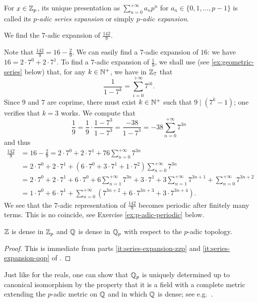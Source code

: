 \documentclass[12pt, leqno, british]{amsart}
\begin{document}
For $x \in \mathbb Z_p$, its unique presentation as $\sum_{n=0}^{+\infty} a_np^n$ for $a_n \in \lbrace 0, 1, \ldots, p-1 \rbrace$ is called its \emph{$p$-adic series expansion} or simply \emph{$p$-adic expansion}.
\begin{eg}
We find the $7$-adic expansion of $\frac{142}{9}$.

Note that $\frac{142}{9} = 16 - \frac{2}{9}$.
We can easily find a $7$-adic expansion of $16$: we have $16 = 2\cdot 7^0 + 2 \cdot 7^1$.
To find a $7$-adic expansion of $\frac{1}{9}$, we shall use (see \eqref{ex:geometric-series} below) that, for any $k \in \mathbb N^+$, we have in $\mathbb Z_7$ that
$$ \frac{1}{1-7^k} = \sum_{i=0}^{+\infty} 7^{ik}.$$
Since $9$ and $7$ are coprime, there must exist $k \in \mathbb N^+$ such that $9 \mid (7^k - 1)$; one verifies that $k = 3$ works.
We compute that
$$\frac{1}{9} = \frac{1}{9} \cdot \frac{1 - 7^3}{1 - 7^3} = \frac{-38}{1 - 7^3} = -38\sum_{n=0}^{+\infty} 7^{3n}$$
and thus
\begin{align*}
\frac{142}{9} &= 16 - \frac{2}{9} = 2 \cdot 7^0 + 2 \cdot 7^1 + 76 \sum_{n=0}^{+\infty} 7^{3n} \\
&= 2\cdot 7^0 + 2 \cdot 7^1 + (6\cdot 7^0 + 3 \cdot 7^1 + 1 \cdot 7^2)\sum_{n=0}^{+\infty} 7^{3n} \\
&= 2 \cdot 7^0 + 2 \cdot 7^1 + 6\cdot 7^0 + 6\sum_{n=1}^{+\infty} 7^{3n} + 3\cdot 7^1 + 3\sum_{n=1}^{+\infty} 7^{3n+1} + \sum_{n=0}^{+\infty}7^{3n+2} \\
&= 1 \cdot 7^0 + 6 \cdot 7^1 + \sum_{n=0}^{+\infty} (7^{3n+2} + 6 \cdot 7^{3n+3} + 3 \cdot 7^{3n+4}).
\end{align*}
We see that the $7$-adic representation of $\frac{142}{9}$ becomes periodic after finitely many terms.
This is no coincide, see Exercise \eqref{ex:p-adic-periodic} below.
\end{eg}
\begin{cor}
$\mathbb Z$ is dense in $\mathbb Z_p$ and $\mathbb Q$ is dense in $\mathbb Q_p$ with respect to the $p$-adic topology.
\end{cor}
\begin{proof}
This is immediate from parts \eqref{it:series-expansion-zzp} and \eqref{it:series-expansion-qqp} of .
\end{proof}
Just like for the reals, one can show that $\mathbb Q_p$ is uniquely determined up to canonical isomorphism by the property that it is a field with a complete metric extending the $p$-adic metric on $\mathbb Q$ and in which $\mathbb Q$ is dense; see e.g.~\cite[Theorem 2.4.3]{Eng05}.
\end{document}
